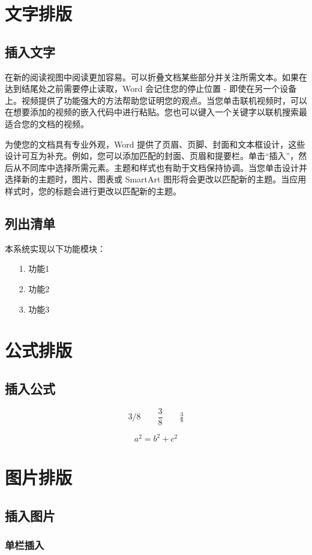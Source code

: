 \setcounter{page}{1}

\section{文字排版}
\subsection{插入文字}
在新的阅读视图中阅读更加容易。可以折叠文档某些部分并关注所需文本。如果在达到结尾处之前需要停止读取，Word 会记住您的停止位置 - 即使在另一个设备上。视频提供了功能强大的方法帮助您证明您的观点。当您单击联机视频时，可以在想要添加的视频的嵌入代码中进行粘贴。您也可以键入一个关键字以联机搜索最适合您的文档的视频。\cite{a2021b}
\par 为使您的文档具有专业外观，Word 提供了页眉、页脚、封面和文本框设计，这些设计可互为补充。例如，您可以添加匹配的封面、页眉和提要栏。单击“插入”，然后从不同库中选择所需元素。主题和样式也有助于文档保持协调。当您单击设计并选择新的主题时，图片、图表或 SmartArt 图形将会更改以匹配新的主题。当应用样式时，您的标题会进行更改以匹配新的主题。


\subsection{列出清单}
\par 本系统实现以下功能模块：
\begin{itemize}
    \item[1.] 功能1
    \item[2.] 功能2
    \item[3.] 功能3
\end{itemize}
\section{公式排版}
\subsection{插入公式}
\[
    3/8 \qquad \frac{3}{8}
    \qquad \tfrac{3}{8}
\]

\[
    a^2  = b^2 + c^2
\]

\section{图片排版}
\subsection{插入图片}
\subsubsection{单栏插入}

